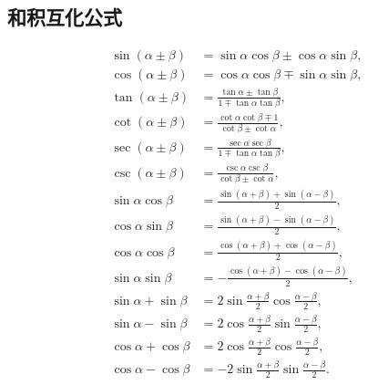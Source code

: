 \subsection{和积互化公式}
\begin{theorem}[和积互化公式]
\begin{align}
	\sin(\alpha\pm\beta) &= \sin\alpha\cos\beta\pm\cos\alpha\sin\beta, \label{equation:函数.三角函数.和积互化公式1} \\
	\cos(\alpha\pm\beta) &= \cos\alpha\cos\beta\mp\sin\alpha\sin\beta, \label{equation:函数.三角函数.和积互化公式2} \\
	\tan(\alpha\pm\beta) &= \frac{\tan\alpha\pm\tan\beta}{1\mp\tan\alpha\tan\beta}, \label{equation:函数.三角函数.和积互化公式3} \\
	\cot(\alpha\pm\beta) &= \frac{\cot\alpha\cot\beta\mp 1}{\cot\beta\pm\cot\alpha}, \label{equation:函数.三角函数.和积互化公式4} \\
	\sec(\alpha\pm\beta) &= \frac{\sec\alpha\sec\beta}{1\mp\tan\alpha\tan\beta}, \label{equation:函数.三角函数.和积互化公式5} \\
	\csc(\alpha\pm\beta) &= \frac{\csc\alpha\csc\beta}{\cot\beta\pm\cot\alpha}, \label{equation:函数.三角函数.和积互化公式6} \\
	\sin \alpha \cos \beta &= \frac{\sin (\alpha + \beta) + \sin (\alpha - \beta)}{2}, \label{equation:函数.三角函数.和积互化公式7} \\
	\cos \alpha \sin \beta &= \frac{\sin (\alpha + \beta) - \sin (\alpha - \beta)}{2}, \label{equation:函数.三角函数.和积互化公式8} \\
	\cos \alpha \cos \beta &= \frac{\cos (\alpha + \beta) + \cos (\alpha - \beta)}{2}, \label{equation:函数.三角函数.和积互化公式9} \\
	\sin \alpha \sin \beta &= -\frac{\cos (\alpha + \beta) - \cos (\alpha - \beta)}{2}, \label{equation:函数.三角函数.和积互化公式10} \\
	\sin \alpha + \sin \beta &= 2 \sin \frac{\alpha + \beta}{2} \cos \frac{\alpha - \beta}{2}, \label{equation:函数.三角函数.和积互化公式11} \\
	\sin \alpha - \sin \beta &= 2 \cos \frac{\alpha + \beta}{2} \sin \frac{\alpha - \beta}{2}, \label{equation:函数.三角函数.和积互化公式12} \\
	\cos \alpha + \cos \beta &= 2 \cos \frac{\alpha + \beta}{2} \cos \frac{\alpha - \beta}{2}, \label{equation:函数.三角函数.和积互化公式13} \\
	\cos \alpha - \cos \beta &= -2 \sin \frac{\alpha + \beta}{2} \sin \frac{\alpha - \beta}{2}. \label{equation:函数.三角函数.和积互化公式14}

\end{align}
\end{theorem}
